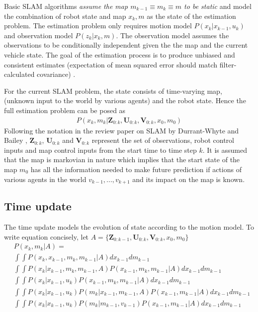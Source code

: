 \documentclass[10pt,twocolumn,letterpaper]{article}
\begin{document}
Basic SLAM algorithms \textit{assume the map $m_{k-1} \equiv m_k \equiv m$ to be static} and model the combination of robot state and map $x_k,m$ as the state of the estimation problem. The estimation problem only requires motion model $P(x_k|x_{k-1},u_k)$ and observation model $P(z_k|x_k,m)$. The observation model assumes the observations to be conditionally independent given the the map and the current vehicle state. The goal of the estimation process is to produce unbiased and consistent estimates (expectation of mean squared error should match filter-calculated covariance) \cite{yaakov2001estimation}.

For the current SLAM problem, the state consists of time-varying map, (unknown input to the world by various agents) and the robot state. Hence the full estimation problem can be posed as 
\begin{align}
P(x_k,m_k|\mathbf{Z}_{0:k},\mathbf{U}_{0:k},\mathbf{V}_{0:k},x_0,m_0)
\end{align}
Following the notation in the review paper on SLAM by Durrant-Whyte and Bailey \cite{durrant2006simultaneous}, $\mathbf{Z}_{0:k}$, $\mathbf{U}_{0:k}$ and $\mathbf{V}_{0:k}$ represent the set of observations, robot control inputs and map control inputs from the start time to time step $k$. It is assumed that the map is markovian in nature which implies that the start state of the map $m_0$ has all the information needed to make future prediction if actions of various agents in the world $v_{k-1},...,v_{k+1}$ and its impact on the map is known.

\subsection{Time update} The time update models the evolution of state according to the motion model. To write equation concisely, let $A =\{ \mathbf{Z}_{0:k-1},\mathbf{U}_{0:k},\mathbf{V}_{0:k},x_0,m_0 \}$
\begin{align}
&P(x_k,m_k|A) = \nonumber \\
&\int \int P(x_k,x_{k-1},m_k,m_{k-1}|A) dx_{k-1} dm_{k-1} \nonumber \\
&\int \int P(x_k|x_{k-1},m_k,m_{k-1},A)P(x_{k-1},m_k,m_{k-1}|A) dx_{k-1}dm_{k-1} \nonumber \\
&\int \int P(x_k|x_{k-1},u_k)P(x_{k-1},m_k,m_{k-1}|A) dx_{k-1}dm_{k-1} \nonumber \\
&\int \int P(x_k|x_{k-1},u_k)P(m_k|x_{k-1},m_{k-1},A)P(x_{k-1},m_{k-1}|A)  dx_{k-1}dm_{k-1} \nonumber \\
&\int \int P(x_k|x_{k-1},u_k)P(m_k|m_{k-1},v_{k-1})P(x_{k-1},m_{k-1}|A) dx_{k-1}dm_{k-1} \nonumber \\
\label{eq:time_update}
\end{align}
\end{document}
